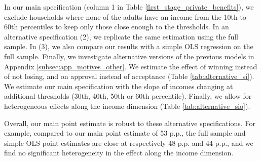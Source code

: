 \documentclass[12pt]{article} %
\begin{document}
In our main specification (column 1 in Table \ref{first_stage_private_benefits}), we exclude households where none of the adults have an income from the 10th to 60th percentiles to keep only those close enough to the thresholds. In an alternative specification (2), we replicate the same estimation using the full sample. In (3), we also compare our results with a simple OLS regression on the full sample. Finally, we investigate alternative versions of the previous models in Appendix \ref{subsec:app_motives_other}. We estimate the effect of winning instead of not losing, and on approval instead of acceptance (Table \ref{tab:alternative_si}). We estimate our main specification with the slope of incomes changing at additional thresholds (30th, 40th, 50th or 60th percentile). Finally, we allow for heterogeneous effects along the income dimension (Table \ref{tab:alternative_sio}).

Overall, our main point estimate is robust to these alternative specifications. For example, compared to our main point estimate of 53 p.p., the full sample and simple OLS point estimates are close at respectively 48 p.p. and 44 p.p., and we find no significant heterogeneity in the effect along the income dimension.

 
\end{document}
